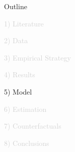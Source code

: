 \documentclass[aspectratio=169]{beamer}
\begin{document}

\begin{frame}[noframenumbering]{Outline}

\Large

\textcolor{lightgray}{1) Literature}

\vspace{3mm}

\textcolor{lightgray}{2) Data}

\vspace{3mm}

\textcolor{lightgray}{3) Empirical Strategy}

\vspace{3mm}

\textcolor{lightgray}{4) Results}

\vspace{3mm}

5) Model

\vspace{3mm}

\textcolor{lightgray}{6) Estimation}

\vspace{3mm}

\textcolor{lightgray}{7) Counterfactuals}

\vspace{3mm}

\textcolor{lightgray}{8) Conclusions}


\end{frame}

\end{document}
